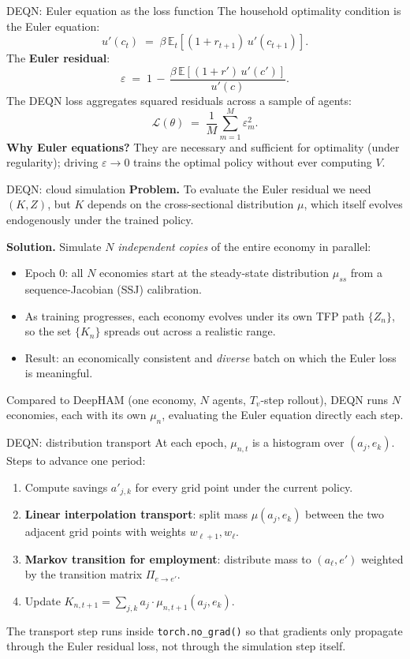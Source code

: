 \documentclass[10pt,english,aspectratio=169]{beamer}
\begin{document}
\begin{frame}{DEQN: Euler equation as the loss function}
The household optimality condition is the Euler equation:
\[
u'(c_t) \;=\; \beta\,\mathbb{E}_t\!\left[(1+r_{t+1})\,u'(c_{t+1})\right].
\]
\medskip
The \textbf{Euler residual}:
\[
\varepsilon \;=\; 1 \,-\, \frac{\beta\,\mathbb{E}\!\left[(1+r')\,u'(c')\right]}{u'(c)}.
\]
\medskip
The DEQN loss aggregates squared residuals across a sample of agents:
\[
\mathcal{L}(\theta) \;=\; \frac{1}{M}\sum_{m=1}^{M} \varepsilon_m^2.
\]
\medskip
\textbf{Why Euler equations?} They are necessary and sufficient for optimality (under regularity); driving $\varepsilon\to 0$ trains the optimal policy without ever computing $V$.
\end{frame}

\begin{frame}{DEQN: cloud simulation}
\textbf{Problem.} To evaluate the Euler residual we need $(K, Z)$, but $K$ depends on the cross-sectional distribution $\mu$, which itself evolves endogenously under the trained policy.
\medskip

\textbf{Solution.} Simulate $N$ \emph{independent copies} of the entire economy in parallel:
\medskip
\begin{itemize}
\item Epoch 0: all $N$ economies start at the steady-state distribution $\mu_{ss}$ from a sequence-Jacobian (SSJ) calibration.
\item As training progresses, each economy evolves under its own TFP path $\{Z_n\}$, so the set $\{K_n\}$ spreads out across a realistic range.
\item Result: an economically consistent and \emph{diverse} batch on which the Euler loss is meaningful.
\end{itemize}
\medskip
Compared to DeepHAM (one economy, $N$ agents, $T_v$-step rollout), DEQN runs $N$ economies, each with its own $\mu_n$, evaluating the Euler equation directly each step.
\end{frame}

\begin{frame}{DEQN: distribution transport}
At each epoch, $\mu_{n,t}$ is a histogram over $(a_j, e_k)$. Steps to advance one period:
\medskip

\begin{enumerate}
\item Compute savings $a'_{j,k}$ for every grid point under the current policy.
\item \textbf{Linear interpolation transport}: split mass $\mu(a_j, e_k)$ between the two adjacent grid points with weights $w_{\ell+1}, w_\ell$.
\item \textbf{Markov transition for employment}: distribute mass to $(a_\ell, e')$ weighted by the transition matrix $\Pi_{e\to e'}$.
\item Update $K_{n,t+1} = \sum_{j,k} a_j \cdot \mu_{n,t+1}(a_j, e_k)$.
\end{enumerate}
\medskip

The transport step runs inside \texttt{torch.no\_grad()} so that gradients only propagate through the Euler residual loss, not through the simulation step itself.
\end{frame}
\end{document}
